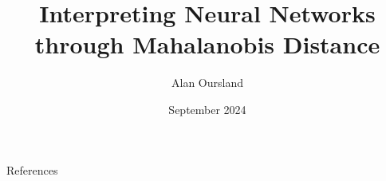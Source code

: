 \documentclass[11pt]{article}
\title{Interpreting Neural Networks through Mahalanobis Distance}
\author{Alan Oursland}
\affil{Independent Researcher}
\date{September 2024}
\begin{document}
\maketitle

\begin{abstract}
% 
\end{abstract}
 







References


\end{document}
